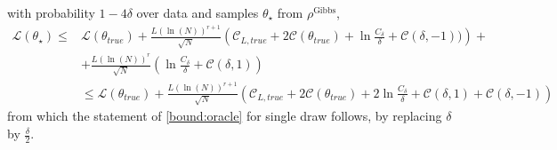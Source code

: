 \documentclass{article}
\begin{document}
with probability $1-4\delta$ over data and samples $\theta_{\star}$ from $\rho^{\text{Gibbs}}$,
\begin{align}
  \mathcal{L}(\theta_{\star}) \le & \mathcal{L}(\theta_{true})+\frac{L(\ln(N))^{r+1}}{\sqrt{N}} \left( \mathcal{C}_{L,true} + 2\mathcal{C}(\theta_{true}) + \ln\frac{C_{\delta}}{\delta} + \mathcal{C}(\delta,-1)) \right) +  \nonumber  \\
 &+  \frac{L(\ln(N))^{r}}{\sqrt{N}}\left(\ln\frac{C_{\delta}}{\delta} +  \mathcal{C}(\delta,1)\right) \nonumber \\
 & \le \mathcal{L}(\theta_{true})+\frac{L(\ln(N))^{r+1}}{\sqrt{N}} \left( \mathcal{C}_{L,true} + 2\mathcal{C}(\theta_{true}) + 2\ln\frac{C_{\delta}}{\delta} +  \mathcal{C}(\delta,1) + \mathcal{C}(\delta,-1)\right)
 \nonumber
\end{align}
from which the statement of \eqref{bound:oracle} for single draw follows, by replacing $\delta$ by $\frac{\delta}{2}$.
\end{document}
